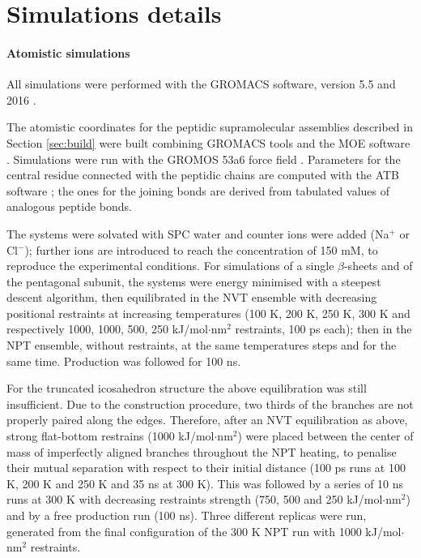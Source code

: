 \section{Simulations details} \label{sec:details}

\paragraph{Atomistic simulations}
All simulations were performed with the GROMACS software, version 5.5 and 2016 \cite{Berendsen1995,Abraham2015,gromacs_man}. 

The atomistic coordinates for the peptidic supramolecular assemblies described in Section \ref{sec:build} were built combining GROMACS tools and the MOE software \cite{moe}.
%
Simulations were run with the GROMOS 53a6 force field \cite{Oostenbrink2004}. Parameters for the central residue connected with the peptidic chains are computed with the ATB software \cite{Malde2011, Koziara2014}; the ones for the joining bonds are derived from tabulated values of analogous peptide bonds. 

The systems were solvated with SPC water \cite{Berendsen1981} and counter ions were added (Na$^+$ or Cl$^-$); further ions are introduced to reach the concentration of 150 mM, to reproduce the experimental conditions.
%
For simulations of a single $\beta$-sheets and of the pentagonal subunit, the systems were energy minimised with a steepest descent algorithm, then equilibrated in the NVT ensemble with decreasing positional restraints at increasing temperatures (100 K, 200 K, 250 K, 300 K and respectively 1000, 1000, 500, 250 kJ/mol$\cdot$nm$^2$ restraints, 100 ps each); then in the NPT ensemble, without restraints, at the same temperatures steps and for the same time. Production was followed for 100 ns.

For the truncated icosahedron structure the above equilibration was still insufficient. Due to the construction procedure, two thirds of the branches are not properly paired along the edges.
%
Therefore, after an NVT equilibration as above, strong flat-bottom restrains (1000 kJ/mol$\cdot$nm$^2$) were placed between the center of mass of imperfectly aligned branches throughout the NPT heating, to penalise their mutual separation with respect to their initial distance (100 ps runs at 100 K, 200 K and 250 K and 35 ns at 300 K).
%
This was followed by a series of 10 ns runs at 300 K with decreasing restraints strength (750, 500 and 250 kJ/mol$\cdot$nm$^2$) and by a free production run (100 ns).
%
Three different replicas were run, generated from the final configuration of the 300 K NPT run with 1000 kJ/mol$\cdot$nm$^2$ restraints.

